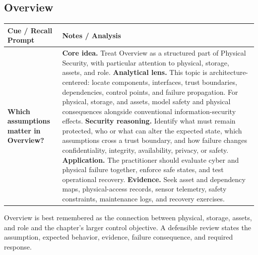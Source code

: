 \documentclass[11pt]{article}
\newcommand{\CornellHeader}{%
\rowcolor{Navy}\color{white}\bfseries Cue / Recall Prompt & \color{white}\bfseries Notes / Analysis\\\hline}
\newcommand{\CornellRow}[2]{%
\cellcolor{CueGray}\RaggedRight\textbf{#1} & \RaggedRight #2\\\hline}
\begin{document}
\subsection*{Overview}
\begin{longtable}{>{\RaggedRight\arraybackslash}p{}|>{\RaggedRight\arraybackslash}p{}}
\CornellHeader
\CornellRow{Which assumptions matter in Overview?}{\textbf{Core idea.} Treat Overview as a structured part of Physical Security, with particular attention to physical, storage, assets, and role. \textbf{Analytical lens.} This topic is architecture-centered: locate components, interfaces, trust boundaries, dependencies, control points, and failure propagation. For physical, storage, and assets, model safety and physical consequences alongside conventional information-security effects. \textbf{Security reasoning.} Identify what must remain protected, who or what can alter the expected state, which assumptions cross a trust boundary, and how failure changes confidentiality, integrity, availability, privacy, or safety. \textbf{Application.} The practitioner should evaluate cyber and physical failure together, enforce safe states, and test operational recovery. \textbf{Evidence.} Seek asset and dependency maps, physical-access records, sensor telemetry, safety constraints, maintenance logs, and recovery exercises.}
\end{longtable}
\begin{topicsummary}
Overview is best remembered as the connection between physical, storage, assets, and role and the chapter's larger control objective. A defensible review states the assumption, expected behavior, evidence, failure consequence, and required response.
\end{topicsummary}
\end{document}
